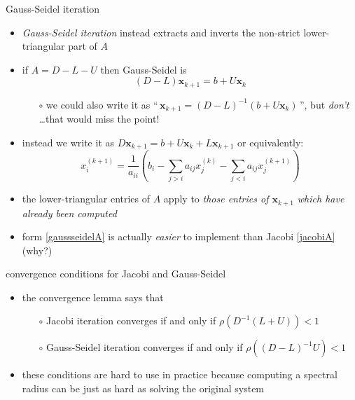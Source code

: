 \documentclass[10pt,hyperref]{beamer}
\newcommand{\bx}{\mathbf{x}}
\begin{document}
\begin{frame}{Gauss-Seidel iteration}

\begin{itemize}
\item \emph{Gauss-Seidel iteration} instead extracts and inverts the non-strict lower-triangular part of $A$
\item if $A = D - L - U$ then Gauss-Seidel is
\begin{equation}
(D - L) \bx_{k+1} = b + U \bx_k  \label{gaussseidel}
\end{equation}

\vspace{-2mm}
  \begin{itemize}
  \item[$\circ$] we could also write it as ``\,$\bx_{k+1} = (D-L)^{-1} \left(b + U \bx_k\right)$\,'', but \emph{don't} \dots that would miss the point!
  \end{itemize}
\item instead we write it as \quad $D \bx_{k+1} = b + U \bx_k + L \bx_{k+1}$ \quad or equivalently:
\begin{equation}
x_i^{(k+1)} = \frac{1}{a_{ii}} \left(b_i - \sum_{j > i} a_{ij} x_j^{(k)} - \sum_{j < i} a_{ij} x_j^{(k+1)}\right)  \label{gaussseidelA}
\end{equation}
\item the lower-triangular entries of $A$ apply to \emph{those entries of $\bx_{k+1}$ which have already been computed}
\item form \eqref{gaussseidelA} is actually \emph{easier} to implement than Jacobi \eqref{jacobiA}  \quad (why?)
\end{itemize}
\end{frame}


\begin{frame}{convergence conditions for Jacobi and Gauss-Seidel}

\begin{itemize}
\item the convergence lemma says that
  \begin{itemize}
  \item[$\circ$] Jacobi iteration converges if and only if $\rho(D^{-1} (L+U)) < 1$
  \item[$\circ$] Gauss-Seidel iteration converges if and only if $\rho((D-L)^{-1} U) < 1$
  \end{itemize}
\item these conditions are hard to use in practice because computing a spectral radius can be just as hard as solving the original system
\end{itemize}
\end{frame}
\end{document}

